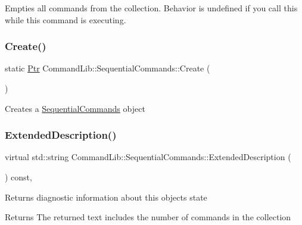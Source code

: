 Empties all commands from the collection. Behavior is undefined if you call this while this command is executing. 

\mbox{\label{class_command_lib_1_1_sequential_commands_aaacdef25d7dba29bae8ff7763c55017e}} 
\subsubsection{\texorpdfstring{Create()}{Create()}}
{\footnotesize\ttfamily static \mbox{\hyperlink{class_command_lib_1_1_command_a3b3e4f00144373299df5c6bb1acc319d}{Ptr}} Command\+Lib\+::\+Sequential\+Commands\+::\+Create (\begin{DoxyParamCaption}{ }\end{DoxyParamCaption})\hspace{0.3cm}{\ttfamily [static]}}



Creates a \mbox{\hyperlink{class_command_lib_1_1_sequential_commands}{Sequential\+Commands}} object 

\mbox{\label{class_command_lib_1_1_sequential_commands_a8109d8d9b2c4a191cad02164ca173709}} 
\subsubsection{\texorpdfstring{Extended\+Description()}{ExtendedDescription()}}
{\footnotesize\ttfamily virtual std\+::string Command\+Lib\+::\+Sequential\+Commands\+::\+Extended\+Description (\begin{DoxyParamCaption}{ }\end{DoxyParamCaption}) const\hspace{0.3cm}{\ttfamily [override]}, {\ttfamily [virtual]}}



Returns diagnostic information about this object\textquotesingle{}s state 

\begin{DoxyReturn}{Returns}
The returned text includes the number of commands in the collection 
\end{DoxyReturn}


